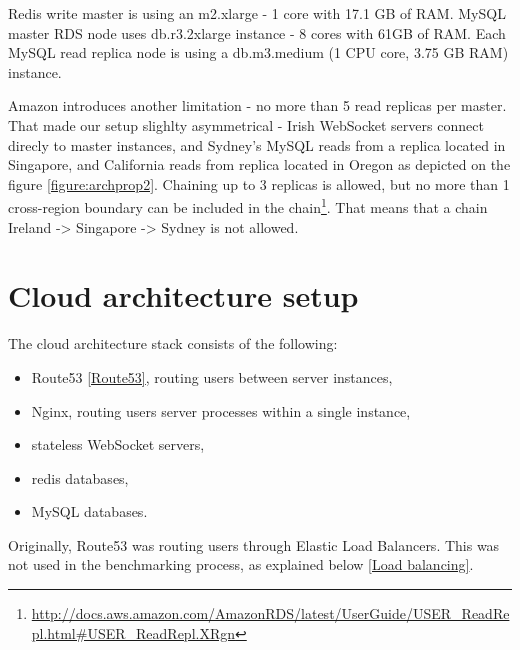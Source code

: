 \documentclass{uvamscse}
\begin{document}
Redis write master is using an m2.xlarge - 1 core with 17.1 GB of RAM. MySQL master RDS node uses db.r3.2xlarge instance - 8 cores with 61GB of RAM. Each MySQL read replica node is using a db.m3.medium (1 CPU core, 3.75 GB RAM) instance.

Amazon introduces another limitation - no more than 5 read replicas per master. That made our setup slighlty asymmetrical - Irish WebSocket servers connect direcly to master instances, and Sydney's MySQL reads from a replica located in Singapore, and California reads from replica located in Oregon as depicted on the figure \ref{figure:archprop2}. Chaining up to 3 replicas is allowed, but no more than 1 cross-region boundary can be included in the chain\footnote{\url{http://docs.aws.amazon.com/AmazonRDS/latest/UserGuide/USER_ReadRepl.html\#USER\_ReadRepl.XRgn}}. That means that a chain Ireland -> Singapore -> Sydney is not allowed.

\section{Cloud architecture setup} \label{Cloud architecture setup}
The cloud architecture stack consists of the following:
\begin{itemize}
  \item Route53 \ref{Route53}, routing users between server instances,
  \item Nginx, routing users server processes within a single instance,
  \item stateless WebSocket servers,
  \item redis databases,
  \item MySQL databases.
\end{itemize}

Originally, Route53 was routing users through Elastic Load Balancers. This was not used in the benchmarking process, as explained below \ref{Load balancing}.
\end{document}
